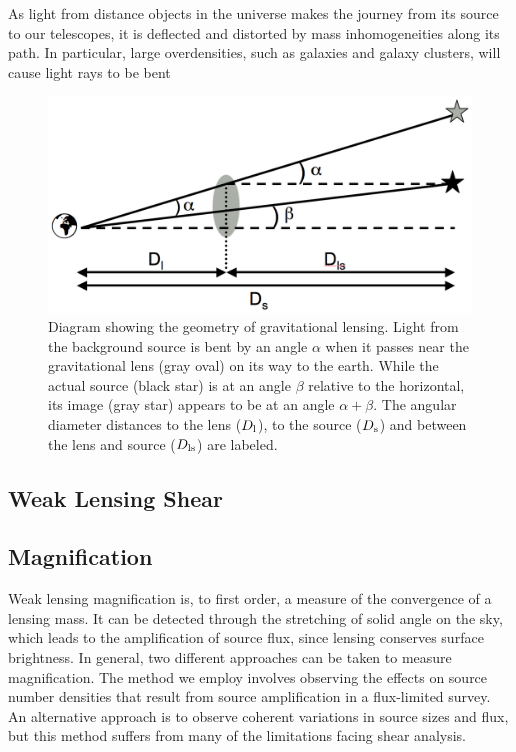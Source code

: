 As light from distance objects in the universe makes the journey from its source to our telescopes, it is deflected and distorted by mass inhomogeneities along its path. In particular, large overdensities, such as galaxies and galaxy clusters, will cause light rays to be bent 

\begin{figure}
\begin{center}
\includegraphics[scale=0.3]{plots_intro/LensDiagram.png}
\caption[Gravitational Lensing Diagram]{Diagram showing the geometry of gravitational lensing. Light from the background source is bent by an angle $\alpha$ when it passes near the gravitational lens (gray oval) on its way to the earth. While the actual source (black star) is at an angle $\beta$ relative to the horizontal, its image (gray star) appears to be at an angle $\alpha+\beta$. The angular diameter distances to the lens ($D_{\rm l}$), to the source ($D_{\rm s}$) and between the lens and source ($D_{\rm ls}$) are labeled.}
\label{lensing}
\end{center}
\end{figure}


\subsection{Weak Lensing Shear}

\subsection{Magnification}
\label{sec:mag}
Weak lensing magnification is, to first order, a measure of the convergence of a lensing mass.  It can be detected through the stretching of solid angle on the sky, which leads to the amplification of source flux, since lensing conserves surface brightness. In general, two different approaches can be taken to measure magnification.  The method we employ involves observing the effects on source number densities that result from source amplification in a flux-limited survey. An alternative approach is to observe coherent variations in source sizes and flux, but this method suffers from many of the limitations facing shear analysis.

